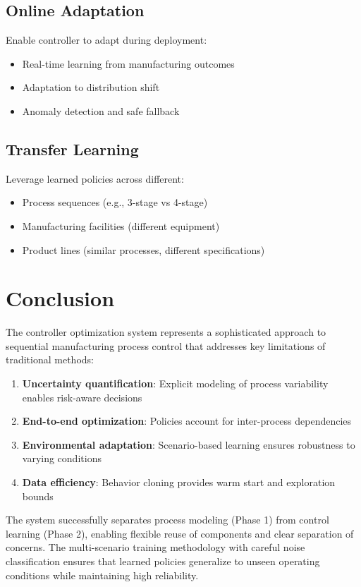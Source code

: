 \documentclass[11pt,a4paper]{article}
\begin{document}
\subsection{Online Adaptation}

Enable controller to adapt during deployment:
\begin{itemize}
    \item Real-time learning from manufacturing outcomes
    \item Adaptation to distribution shift
    \item Anomaly detection and safe fallback
\end{itemize}

\subsection{Transfer Learning}

Leverage learned policies across different:
\begin{itemize}
    \item Process sequences (e.g., 3-stage vs 4-stage)
    \item Manufacturing facilities (different equipment)
    \item Product lines (similar processes, different specifications)
\end{itemize}

\section{Conclusion}

The controller optimization system represents a sophisticated approach to sequential manufacturing process control that addresses key limitations of traditional methods:

\begin{enumerate}
    \item \textbf{Uncertainty quantification}: Explicit modeling of process variability enables risk-aware decisions
    \item \textbf{End-to-end optimization}: Policies account for inter-process dependencies
    \item \textbf{Environmental adaptation}: Scenario-based learning ensures robustness to varying conditions
    \item \textbf{Data efficiency}: Behavior cloning provides warm start and exploration bounds
\end{enumerate}

The system successfully separates process modeling (Phase 1) from control learning (Phase 2), enabling flexible reuse of components and clear separation of concerns. The multi-scenario training methodology with careful noise classification ensures that learned policies generalize to unseen operating conditions while maintaining high reliability.
\end{document}
